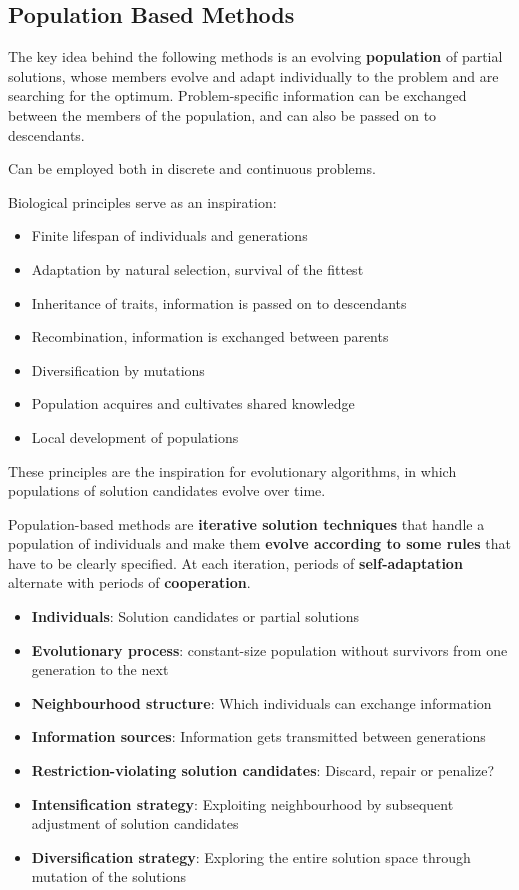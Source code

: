 \documentclass[11pt]{article}
\begin{document}
\subsection{Population Based Methods}
The key idea behind the following methods is an evolving \textbf{population} of partial solutions, whose members evolve and adapt individually to the problem and are searching for the optimum. Problem-specific information can be exchanged between the members of the population, and can also be passed on to descendants.

Can be employed both in discrete and continuous problems.

Biological principles serve as an inspiration:
\begin{itemize}
	\item Finite lifespan of individuals and generations
	\item Adaptation by natural selection, survival of the fittest
	\item Inheritance of traits, information is passed on to descendants
	\item Recombination, information is exchanged between parents
	\item Diversification by mutations
	\item Population acquires and cultivates shared knowledge
	\item Local development of populations
\end{itemize}

These principles are the inspiration for evolutionary algorithms, in which populations of solution candidates evolve over time.

\begin{theorem}
	Population-based methods are \textbf{iterative solution techniques} that handle a population of individuals and make them \textbf{evolve according to some rules} that have to be clearly specified. At each iteration, periods of \textbf{self-adaptation} alternate with periods of \textbf{cooperation}.
\end{theorem}

\begin{itemize}
	\item \textbf{Individuals}: Solution candidates or partial solutions
	\item \textbf{Evolutionary process}: constant-size population without survivors from one generation to the next
	\item \textbf{Neighbourhood structure}: Which individuals can exchange information
	\item \textbf{Information sources}: Information gets transmitted between generations
	\item \textbf{Restriction-violating solution candidates}: Discard, repair or penalize?
	\item \textbf{Intensification strategy}: Exploiting neighbourhood by subsequent adjustment of solution candidates
	\item \textbf{Diversification strategy}: Exploring the entire solution space through mutation of the solutions
\end{itemize}
\end{document}
